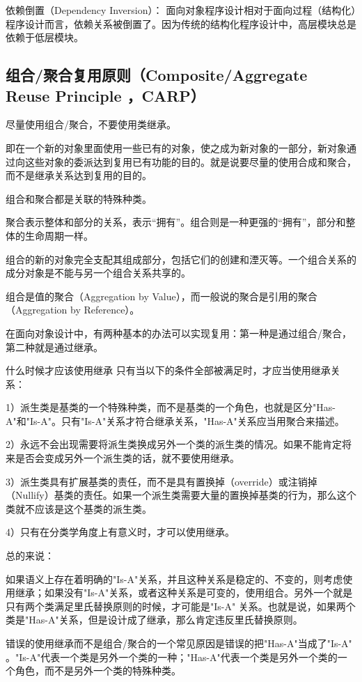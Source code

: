 依赖倒置（Dependency Inversion）：
面向对象程序设计相对于面向过程（结构化）程序设计而言，依赖关系被倒置了。因为传统的结构化程序设计中，高层模块总是依赖于低层模块。

\subsection{组合/聚合复用原则（Composite/Aggregate Reuse Principle ，CARP）}
尽量使用组合/聚合，不要使用类继承。

即在一个新的对象里面使用一些已有的对象，使之成为新对象的一部分，新对象通过向这些对象的委派达到复用已有功能的目的。就是说要尽量的使用合成和聚合，而不是继承关系达到复用的目的。

组合和聚合都是关联的特殊种类。

聚合表示整体和部分的关系，表示“拥有”。组合则是一种更强的“拥有”，部分和整体的生命周期一样。

组合的新的对象完全支配其组成部分，包括它们的创建和湮灭等。一个组合关系的成分对象是不能与另一个组合关系共享的。

组合是值的聚合（Aggregation by Value），而一般说的聚合是引用的聚合（Aggregation by Reference）。

在面向对象设计中，有两种基本的办法可以实现复用：第一种是通过组合/聚合，第二种就是通过继承。

什么时候才应该使用继承
只有当以下的条件全部被满足时，才应当使用继承关系：

1）派生类是基类的一个特殊种类，而不是基类的一个角色，也就是区分"Has-A"和"Is-A"。只有"Is-A"关系才符合继承关系，"Has-A"关系应当用聚合来描述。

2）永远不会出现需要将派生类换成另外一个类的派生类的情况。如果不能肯定将来是否会变成另外一个派生类的话，就不要使用继承。

3）派生类具有扩展基类的责任，而不是具有置换掉（override）或注销掉（Nullify）基类的责任。如果一个派生类需要大量的置换掉基类的行为，那么这个类就不应该是这个基类的派生类。

4）只有在分类学角度上有意义时，才可以使用继承。

总的来说：

如果语义上存在着明确的"Is-A"关系，并且这种关系是稳定的、不变的，则考虑使用继承；如果没有"Is-A"关系，或者这种关系是可变的，使用组合。另外一个就是只有两个类满足里氏替换原则的时候，才可能是"Is-A" 关系。也就是说，如果两个类是"Has-A"关系，但是设计成了继承，那么肯定违反里氏替换原则。

错误的使用继承而不是组合/聚合的一个常见原因是错误的把"Has-A"当成了"Is-A" 。"Is-A"代表一个类是另外一个类的一种；"Has-A"代表一个类是另外一个类的一个角色，而不是另外一个类的特殊种类。
